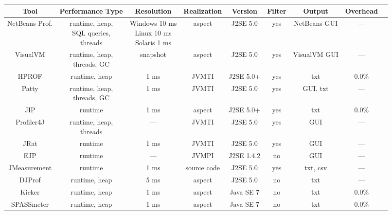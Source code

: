 \begin{table}

    \begin{tabular}{*{9}{c}}
    	\toprule
        Tool & Performance Type & Resolution & Realization & Version & Filter & Output & Overhead \\
        \midrule
        NetBeans Prof. & \makecell{runtime, heap, \\ SQL queries, \\ threads} & \makecell{Windows 10 ms \\ Linux 10 ms \\ Solaris 1 ms} & aspect & J2SE 5.0 & yes & NetBeans GUI & --- \\
        \midrule
        VisualVM & \makecell{runtime, heap, \\ threads, GC} & snapshot & aspect & J2SE 5.0 & yes & VisualVM GUI & --- \\
        \midrule
        HPROF & runtime, heap & 1 ms & JVMTI & J2SE 5.0+ & yes & txt & 0.0\% \\
        \midrule
        Patty & \makecell{runtime, heap, \\ threads, GC} & 1 ms & JVMTI & J2SE 5.0 & yes & GUI, txt & --- \\
        \midrule
        JIP & runtime & 1 ms & aspect & J2SE 5.0+ & yes & txt & 0.0\% \\
        \midrule
        Profiler4J & \makecell{runtime, heap, \\ threads} & --- & JVMTI & J2SE 5.0 & yes & GUI & --- \\
        \midrule
        JRat & runtime & 1 ms & JVMTI & J2SE 5.0 & yes & GUI & --- \\
        \midrule
        EJP & runtime & --- & JVMPI & J2SE 1.4.2 & no & GUI & --- \\
        \midrule
        JMeasurement & runtime & 1 ms & source code & J2SE 5.0 & yes & txt, csv & --- \\
        \midrule
        DJProf & runtime, heap & 5 ms & aspect & J2SE 5.0 & no & txt & --- \\
        \midrule
        Kieker & runtime, heap & 1 ms & aspect & Java SE 7 & no & txt & 0.0\% \\
        \midrule
        SPASSmeter & runtime, heap & 1 ms & aspect & Java SE 7 & no & txt & 0.0\% \\


        \bottomrule
    \end{tabular}
    \label{java_monitoring_tools}
\end{table}


